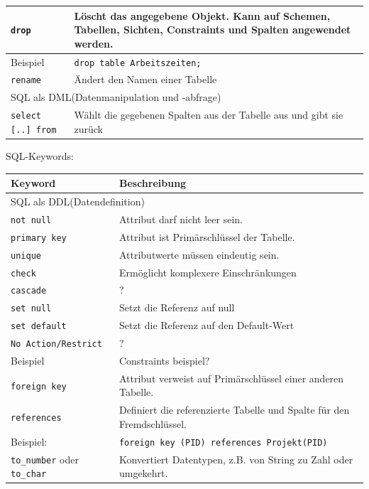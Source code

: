 \documentclass{article}
\begin{document}
\begin{center}
\begin{tabular}{|p{4cm}|p{7cm}|}
    \hline
    \texttt{drop} & Löscht das angegebene Objekt. Kann auf Schemen, Tabellen, Sichten, Constraints und Spalten angewendet werden. \\
    \hline
    Beispiel & \texttt{drop table Arbeitszeiten;} \\
    \hline
    \texttt{rename} & Ändert den Namen einer Tabelle \\
    \hline
    \multicolumn{2}{|p{11cm}|}{SQL als DML(Datenmanipulation und -abfrage)} \\
    \hline
    \texttt{select [..] from} & Wählt die gegebenen Spalten aus der Tabelle aus und gibt sie zurück \\
  \end{tabular}
\end{center}
SQL-Keywords:
\begin{center}
  \begin{longtable}{|p{4cm}|p{7cm}|}
    \hline
    \textbf{Keyword} & \textbf{Beschreibung} \\
    \hline
    \multicolumn{2}{|p{11cm}|}{SQL als DDL(Datendefinition)} \\
    \hline
    \texttt{not null} & Attribut darf nicht leer sein. \\
    \hline
    \texttt{primary key} & Attribut ist Primärschlüssel der Tabelle. \\
    \hline
    \texttt{unique} & Attributwerte müssen eindeutig sein. \\
    \hline
    \texttt{check} & Ermöglicht komplexere Einschränkungen \\
    \hline
    \texttt{cascade} & ? \\
    \hline
    \texttt{set null} & Setzt die Referenz auf null \\
    \hline
    \texttt{set default} & Setzt die Referenz auf den Default-Wert \\
    \hline
    \texttt{No Action/Restrict} & ? \\
    \hline
    Beispiel & Constraints beispiel? \\
    \hline
    \texttt{foreign key} & Attribut verweist auf Primärschlüssel einer anderen Tabelle. \\
    \hline
    \texttt{references} & Definiert die referenzierte Tabelle und Spalte für den Fremdschlüssel. \\
    \hline
    Beispiel: & \texttt{foreign key (PID) references Projekt(PID)} \\
    \hline
    \texttt{to\_number} oder \texttt{to\_char} & Konvertiert Datentypen, z.B. von String zu Zahl oder umgekehrt. \\

\end{longtable}
\end{center}
\end{document}
